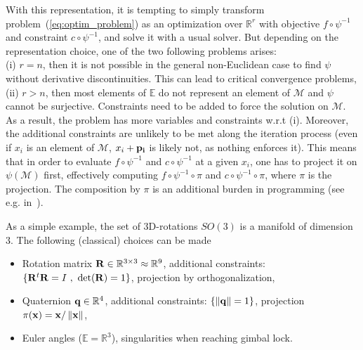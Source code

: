 With this representation, it is tempting to simply transform problem~(\ref{eq:optim_problem}) as an optimization over $\mathbb{R}^r$ with objective $f \circ \psi^{-1}$ and constraint $c \circ \psi^{-1}$, and solve it with a usual solver. But depending on the representation choice, one of the two following problems arises:\\
(i) $r=n$, then it is not possible in the general non-Euclidean case to find $\psi$ without derivative discontinuities. This can lead to critical convergence problems, \\
(ii) $r>n$, then most elements of $\mathbb{E}$ do not represent an element of $\mathcal{M}$ %
and $\psi$ cannot be surjective. Constraints need to be added to force the solution on $\mathcal{M}$. As a result, the problem has more variables and constraints w.r.t (i). Moreover, the additional constraints are unlikely to be met along the iteration process (even if $x_i$ is an element of $\mathcal{M}$, $x_i+{\bf p_i}$ is likely not, as nothing enforces it). This means that in order to evaluate $f \circ \psi^{-1}$ and $c \circ \psi^{-1}$ at a given $x_i$, one has to project it on $\psi(\mathcal{M})$ first, effectively computing $f \circ \psi^{-1} \circ \pi$ and $c \circ \psi^{-1} \circ \pi$, where $\pi$ is the projection. The composition by $\pi$ is an additional burden in programming (see e.g. in~\cite{bouyarmane:humanoids:2012a}).

As a simple example, the set of 3D-rotations $SO(3)$ is a manifold of dimension $3$. The following (classical) choices can be made
\begin{itemize}
  \item Rotation matrix ${\bf R} \in \mathbb{R}^{3\times 3} \approx \mathbb{R}^9$, additional constraints: $\{{\bf R}^t{\bf R} = I\ ,\ \det({\bf R})=1\}$, projection by orthogonalization,
  \item Quaternion ${\bf q} \in \mathbb{R}^4$, additional constraints: $\{ \left\|{\bf q}\right\|=1\}$, projection $\pi({\bf x}) = {\bf x}/\left\|{\bf x}\right\|$,
  \item Euler angles ($\mathbb{E} = \mathbb{R}^3$), singularities when reaching gimbal lock.
\end{itemize}


